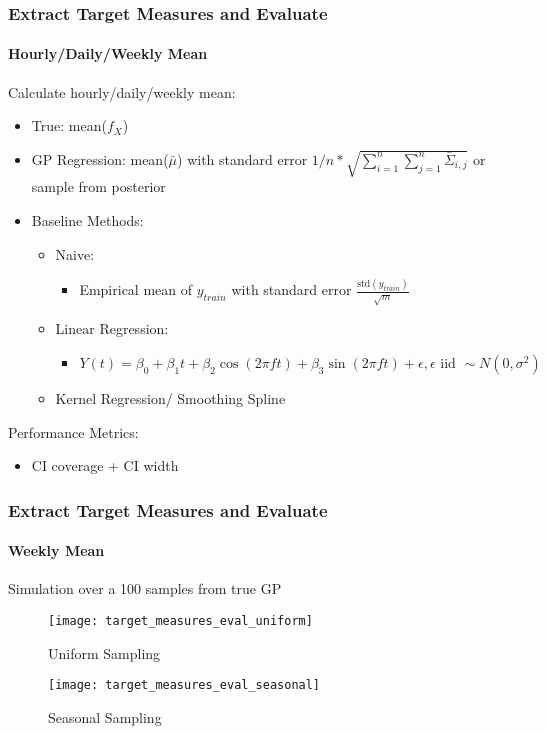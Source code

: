 \documentclass[
	8pt, %
]{beamer}
\begin{document}
\begin{frame}
	\frametitle{Extract Target Measures and Evaluate}
	\framesubtitle{Hourly/Daily/Weekly Mean} %

	Calculate hourly/daily/weekly mean:
	\begin{itemize}
		\item True: mean($f_{X}$)
		\item GP Regression: mean($\bar{\mu}$) with standard error
		$1 / n * \sqrt {\sum_{i=1}^{n}\sum_{j=1}^{n} \bar{\Sigma}_{i,j}}$ or sample from posterior
		\item Baseline Methods:
		\begin{itemize}
			\item Naive:
			\begin{itemize}
				\item Empirical mean of $y_{train}$ with standard error $\frac{\text{std}(y_{train})}{\sqrt{m}}$
			\end{itemize}
			\item Linear Regression:
			\begin{itemize}
				\item $Y(t) = \beta_0 + \beta_1 t + \beta_2 \cos(2 \pi f t) + \beta_3 \sin(2 \pi f t) + \epsilon, \epsilon \text{ iid } \sim N(0, \sigma^2)$

			\end{itemize}
			\item Kernel Regression/ Smoothing Spline
		\end{itemize}
	\end{itemize}

	\bigskip

	Performance Metrics:
	\begin{itemize}
		\item CI coverage + CI width
	\end{itemize}
\end{frame}



\begin{frame}
	\frametitle{Extract Target Measures and Evaluate}
	\framesubtitle{Weekly Mean} %

	Simulation over a 100 samples from true GP

	\begin{figure}
			\texttt{[image: target\_measures\_eval\_uniform]}
			\caption{Uniform Sampling}
	\end{figure}

		\begin{figure}
			\texttt{[image: target\_measures\_eval\_seasonal]}
			\caption{Seasonal Sampling}
	\end{figure}


\end{frame}
\end{document}
